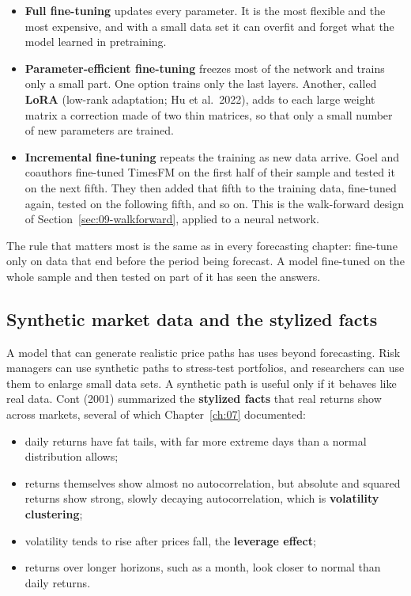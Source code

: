 \begin{itemize}
  \item \textbf{Full fine-tuning} updates every parameter. It is the most flexible and the most expensive, and with a small data set it can overfit and forget what the model learned in pretraining.
  \item \textbf{Parameter-efficient fine-tuning} freezes most of the network and trains only a small part. One option trains only the last layers. Another, called \textbf{LoRA} (low-rank adaptation; Hu et al.\ 2022), adds to each large weight matrix a correction made of two thin matrices, so that only a small number of new parameters are trained.
\item \textbf{Incremental fine-tuning} repeats the training as new data arrive. Goel and coauthors fine-tuned TimesFM on the first half of their sample and tested it on the next fifth. They then added that fifth to the training data, fine-tuned again, tested on the following fifth, and so on. This is the walk-forward design of Section~\ref{sec:09-walkforward}, applied to a neural network.
\end{itemize}

The rule that matters most is the same as in every forecasting chapter: fine-tune only on data that end before the period being forecast. A model fine-tuned on the whole sample and then tested on part of it has seen the answers.

\subsection{Synthetic market data and the stylized facts}

A model that can generate realistic price paths has uses beyond forecasting. Risk managers can use synthetic paths to stress-test portfolios, and researchers can use them to enlarge small data sets. A synthetic path is useful only if it behaves like real data. Cont (2001) summarized the \textbf{stylized facts} that real returns show across markets, several of which Chapter~\ref{ch:07} documented:

\begin{itemize}
  \item daily returns have fat tails, with far more extreme days than a normal distribution allows;
  \item returns themselves show almost no autocorrelation, but absolute and squared returns show strong, slowly decaying autocorrelation, which is \textbf{volatility clustering};
  \item volatility tends to rise after prices fall, the \textbf{leverage effect};
  \item returns over longer horizons, such as a month, look closer to normal than daily returns.
\end{itemize}


